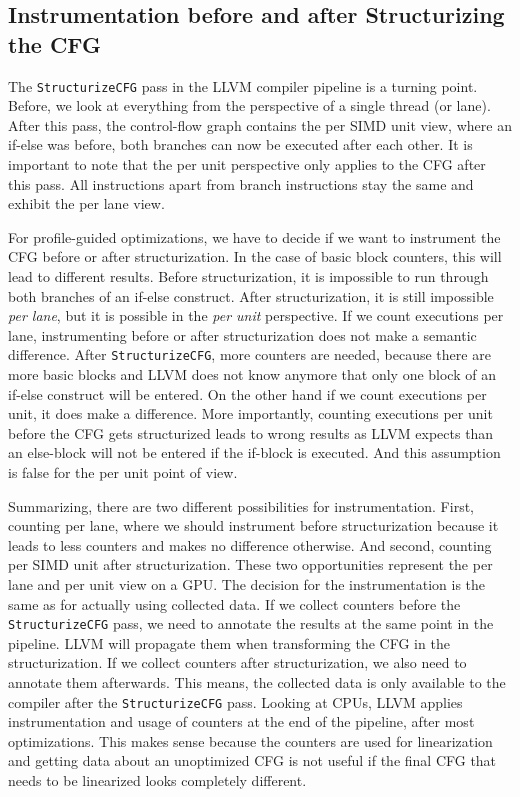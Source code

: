\clearpage
{}
\label{sec:discussion}

\subsection{Instrumentation before and after Structurizing the CFG}
\label{sub:discussion_structurize}
The \texttt{StructurizeCFG} pass in the LLVM compiler pipeline is a turning point. Before, we look at everything from the perspective of a single thread (or lane).
After this pass, the control-flow graph contains the per SIMD unit view, where an if-else was before, both branches can now be executed after each other.
It is important to note that the per unit perspective only applies to the CFG after this pass. All instructions apart from branch instructions stay the same and exhibit the per lane view.

For profile-guided optimizations, we have to decide if we want to instrument the CFG before or after structurization. In the case of basic block counters, this will lead to different results.
Before structurization, it is impossible to run through both branches of an if-else construct. After structurization, it is still impossible \emph{per lane}, but it is possible in the \emph{per unit} perspective.
If we count executions per lane, instrumenting before or after structurization does not make a semantic difference.
After \texttt{StructurizeCFG}, more counters are needed, because there are more basic blocks and LLVM does not know anymore that only one block of an if-else construct will be entered.
On the other hand if we count executions per unit, it does make a difference. More importantly, counting executions per unit before the CFG gets structurized leads to wrong results as LLVM expects than an else-block will not be entered if the if-block is executed. And this assumption is false for the per unit point of view.

Summarizing, there are two different possibilities for instrumentation. First, counting per lane, where we should instrument before structurization because it leads to less counters and makes no difference otherwise.
And second, counting per SIMD unit after structurization. These two opportunities represent the per lane and per unit view on a GPU.
The decision for the instrumentation is the same as for actually using collected data. If we collect counters before the \texttt{StructurizeCFG} pass, we need to annotate the results at the same point in the pipeline.
LLVM will propagate them when transforming the CFG in the structurization.
If we collect counters after structurization, we also need to annotate them afterwards. This means, the collected data is only available to the compiler after the \texttt{StructurizeCFG} pass.
Looking at CPUs, LLVM applies instrumentation and usage of counters at the end of the pipeline, after most optimizations.
This makes sense because the counters are used for linearization and getting data about an unoptimized CFG is not useful if the final CFG that needs to be linearized looks completely different.

